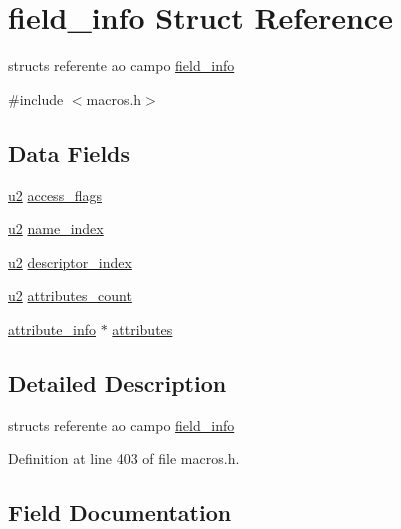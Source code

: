 \hypertarget{structfield__info}{}\section{field\+\_\+info Struct Reference}
\label{structfield__info}


structs referente ao campo \hyperlink{structfield__info}{field\+\_\+info}  




{\ttfamily \#include $<$macros.\+h$>$}

\subsection*{Data Fields}
\begin{DoxyCompactItemize}
\item 
\hyperlink{macros_8h_aa76d8c8015643c6a837661a10142016e}{u2} \hyperlink{structfield__info_a4cc32d48303aeaaaaea05bf77abdec59}{access\+\_\+flags}
\item 
\hyperlink{macros_8h_aa76d8c8015643c6a837661a10142016e}{u2} \hyperlink{structfield__info_ae939ac3ca00f5727beaa02d0e339183d}{name\+\_\+index}
\item 
\hyperlink{macros_8h_aa76d8c8015643c6a837661a10142016e}{u2} \hyperlink{structfield__info_a3f13794b6c8b4ffc87b87a7c01a69060}{descriptor\+\_\+index}
\item 
\hyperlink{macros_8h_aa76d8c8015643c6a837661a10142016e}{u2} \hyperlink{structfield__info_aa53122439ee827a418258d52c51368c6}{attributes\+\_\+count}
\item 
\hyperlink{structattribute__info}{attribute\+\_\+info} $\ast$ \hyperlink{structfield__info_aae221e548ab4ef529cd1a0f2fcdabb9b}{attributes}
\end{DoxyCompactItemize}


\subsection{Detailed Description}
structs referente ao campo \hyperlink{structfield__info}{field\+\_\+info} 

Definition at line 403 of file macros.\+h.



\subsection{Field Documentation}
\hypertarget{structfield__info_a4cc32d48303aeaaaaea05bf77abdec59}{}

